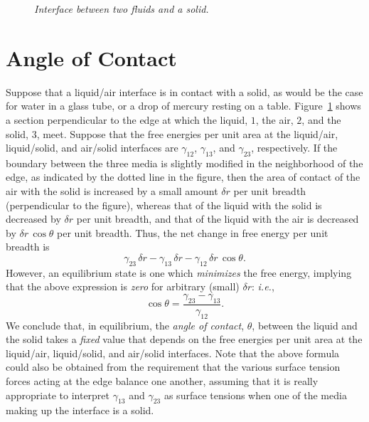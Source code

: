 \begin{figure}
\epsfysize=2in
\centerline{}
\caption{\em Interface between two fluids and a solid.}\label{f6x.02}
\end{figure}

\section{Angle of Contact}
Suppose that a liquid/air interface is in contact with a solid, as would be  the case for water in a glass tube, or a drop
of mercury resting on a table. Figure~\ref{f6x.02} shows a section perpendicular to the edge at which the
liquid, $1$, the air, $2$, and the solid, $3$, meet. Suppose that the free energies per unit
area at the liquid/air, liquid/solid, and air/solid interfaces are $\gamma_{12}$, $\gamma_{13}$, and $\gamma_{23}$,
respectively. If the boundary between the three media is slightly modified in the neighborhood of the edge, as indicated
by the dotted line in the figure, then the area of contact of the air with the solid is increased by a small amount $\delta r$ per unit
breadth (perpendicular to the figure), whereas that of the liquid with the solid is decreased by
$\delta r$ per unit breadth, and that of the liquid with the air is decreased by $\delta r\,\cos\theta$ per unit
breadth. Thus, the net change in free energy per unit breadth is
\begin{equation}
\gamma_{23}\,\delta r - \gamma_{13}\,\delta r - \gamma_{12}\,\delta r\,\cos\theta.
\end{equation}
However, an equilibrium state is one which {\em minimizes}\/ the free energy, implying that the above expression is {\em zero}\/ for arbitrary
(small) $\delta r$: {\em i.e.}, 
\begin{equation}\label{e6x.16}
\cos\theta = \frac{\gamma_{23}-\gamma_{13}}{\gamma_{12}}.
\end{equation}
We conclude that, in equilibrium, the {\em angle of contact}, $\theta$, between the liquid and the solid takes a {\em fixed}\/ value that depends on the
free energies per unit area at the liquid/air, liquid/solid, and  air/solid interfaces. Note that the above formula
could also be obtained from the requirement that the various surface tension forces acting at the edge  balance one another, assuming that
it is really appropriate to interpret $\gamma_{13}$ and $\gamma_{23}$ as surface tensions when one of
the media making up the interface is a solid. 

